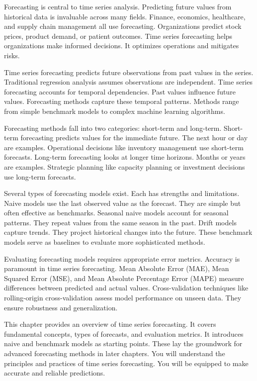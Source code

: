 Forecasting is central to time series analysis. Predicting future values from historical data is invaluable across many fields. Finance, economics, healthcare, and supply chain management all use forecasting. Organizations predict stock prices, product demand, or patient outcomes. Time series forecasting helps organizations make informed decisions. It optimizes operations and mitigates risks.

Time series forecasting predicts future observations from past values in the series. Traditional regression analysis assumes observations are independent. Time series forecasting accounts for temporal dependencies. Past values influence future values. Forecasting methods capture these temporal patterns. Methods range from simple benchmark models to complex machine learning algorithms.

Forecasting methods fall into two categories: short-term and long-term. Short-term forecasting predicts values for the immediate future. The next hour or day are examples. Operational decisions like inventory management use short-term forecasts. Long-term forecasting looks at longer time horizons. Months or years are examples. Strategic planning like capacity planning or investment decisions use long-term forecasts.

Several types of forecasting models exist. Each has strengths and limitations. Naive models use the last observed value as the forecast. They are simple but often effective as benchmarks. Seasonal naive models account for seasonal patterns. They repeat values from the same season in the past. Drift models capture trends. They project historical changes into the future. These benchmark models serve as baselines to evaluate more sophisticated methods.

Evaluating forecasting models requires appropriate error metrics. Accuracy is paramount in time series forecasting. Mean Absolute Error (MAE), Mean Squared Error (MSE), and Mean Absolute Percentage Error (MAPE) measure differences between predicted and actual values. Cross-validation techniques like rolling-origin cross-validation assess model performance on unseen data. They ensure robustness and generalization.

This chapter provides an overview of time series forecasting. It covers fundamental concepts, types of forecasts, and evaluation metrics. It introduces naive and benchmark models as starting points. These lay the groundwork for advanced forecasting methods in later chapters. You will understand the principles and practices of time series forecasting. You will be equipped to make accurate and reliable predictions.



